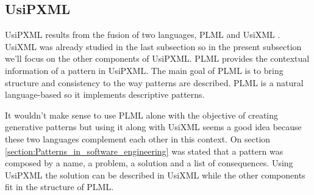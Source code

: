 \subsection{UsiPXML}
UsiPXML results from the fusion of two languages, PLML \cite{Pattern_Language_Markup_Language} and UsiXML \cite{Different_kinds_of_pattern_support_for_interactive_systems}. UsiXML was already studied in the last subsection so in the present subsection we’ll focus on the other components of UsiPXML.
PLML provides the contextual information of a pattern in UsiPXML. The main goal of PLML is to bring structure and consistency to the way patterns are described. PLML is a natural language-based so it implements descriptive patterns. 

It wouldn't make sense to use PLML alone with the objective of creating generative patterns but using it along with UsiXML seems a good idea because these two languages complement each other in this context. On section \ref{section:Patterns_in_software_engineering} was stated that a pattern was composed by a name, a problem, a solution and a list of consequences. Using UsiPXML the solution can be described in UsiXML while the other components fit in the structure of PLML.
